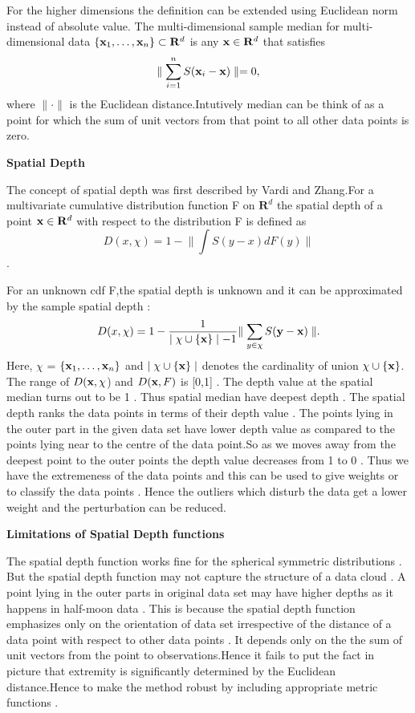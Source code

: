 \documentclass[11pt]{article}
\newcommand{\xvec}{\mbox{\bf x}}
\newcommand{\yvec}{\mbox{\bf y}}
\begin{document}
\begin{flushleft}
For the higher dimensions the definition can be extended using Euclidean norm instead of absolute value. The multi-dimensional sample median for multi-dimensional data $\{\xvec_1,\ldots,\xvec_n\}\subset  \mathbf{R}^d$  is any $\xvec \in \mathbf{R}^d$ that satisfies
$$ \parallel \displaystyle{\sum\limits_{i=1}^n S(\xvec_i-\xvec)} \parallel =0,$$
where $\parallel \cdot \parallel$ is the Euclidean distance.Intutively median can be think of as a point for which the sum of unit vectors from that point to all other data points is zero.

\vspace{0.1in}
\textbf{Spatial Depth}
\vspace{0.1in}

The concept of spatial depth was first described by Vardi and Zhang.For a multivariate cumulative distribution function F on $ \mathbf{R}^d$ the spatial depth of a point  $\xvec \in \mathbf{R}^d$ with respect to the distribution F is defined as $$ D(x,\chi) =1-\displaystyle{ \parallel \int S(y-x)dF(y)\parallel} $$.

For an unknown cdf F,the spatial depth is unknown and it can be approximated by the sample spatial depth :$$ D(x,\chi) = 1-\frac{1}{\mid \chi \cup \{ \xvec \} \mid-1}  \displaystyle{\parallel \sum\limits_{y \in \chi} S(\yvec-\xvec) \parallel}. $$
Here, $\chi$ = $\{\xvec_1,\ldots,\xvec_n\}$ and $\mid \chi \cup \lbrace \xvec \rbrace \mid$ denotes the cardinality of union $\chi \cup \lbrace \xvec \rbrace$.\\ 

The range of $D(\xvec,\chi$) and $D(\xvec,F)$ is [0,1] . The depth value at the spatial median turns out to be 1 . Thus spatial median  have deepest depth . The spatial depth ranks the data points in terms of their depth value . The points lying in the outer part in the given data set have lower depth value as compared to the points lying near to the centre of the data point.So as we moves away from the deepest point to the outer points the depth value decreases from 1 to 0 . Thus we have the extremeness of the data points and this can be used to give weights or to classify the data points . Hence the outliers which disturb the data get a lower weight and the perturbation can be reduced.

 

\vspace{0.1in}
\textbf{Limitations of Spatial Depth functions}
\vspace{0.1in}

The spatial depth function works fine for the spherical symmetric distributions . But the spatial depth function may not capture the structure of a data cloud . A point lying in the outer parts in original data set may have higher depths as it happens in half-moon data . This is because the spatial depth function emphasizes only on the orientation of data set irrespective of the distance of a data point with respect to other data points . It depends only on the the sum of unit vectors from the point to observations.Hence it fails to put the fact in picture that extremity is significantly determined by the Euclidean distance.Hence to make the method robust by including appropriate metric functions .


\end{flushleft}
\end{document}
